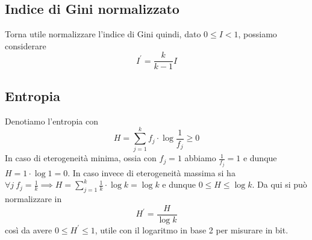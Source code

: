 \documentclass[11pt]{report}
\begin{document}
\subsection{Indice di Gini normalizzato}
Torna utile normalizzare l'indice di Gini quindi, dato $0 \leq I < 1$, possiamo considerare
\begin{equation}
    I^{\prime} = \frac{k}{k - 1}I
\end{equation}
\subsection{Entropia}
Denotiamo l'entropia con
\begin{equation}
    H = \sum_{j=1}^{k}f_j \cdot \log\frac{1}{f_j} \geq 0
\end{equation}
In caso di eterogeneità minima, ossia con $f_j = 1$ abbiamo $\frac{1}{f_j} = 1$ e dunque $H = 1 \cdot \log 1 = 0$. In caso invece di eterogeneità massima si ha $\forall j\ f_j = \frac{1}{k} \implies H = \sum_{j=1}^{k}\frac{1}{k} \cdot \log k = \log k$ e dunque $0 \leq H \leq \log k$. Da qui si può normalizzare in
\begin{equation}
    H^{\prime} = \frac{H}{\log k}
\end{equation}
così da avere $0 \leq H^{\prime} \leq 1$, utile con il logaritmo in base 2 per misurare in bit.
\end{document}
